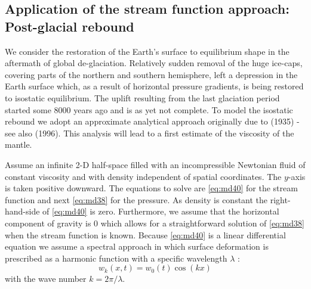 \vspace{0.5cm}
\vspace{0.5cm}

\subsection{Application of the stream function approach: Post-glacial rebound}

We consider the restoration of the Earth’s surface to equilibrium shape in the aftermath of
global de-glaciation. Relatively sudden removal of the huge ice-caps, covering parts of
the northern and southern hemisphere, left a depression in the Earth surface which, as a
result of horizontal pressure gradients, is being restored to isostatic equilibrium. The
uplift resulting from the last glaciation period started some 8000 years ago and is as yet
not complete. To model the isostatic rebound we adopt an approximate analytical
approach originally due to \textcite{hask35} (1935) - see also \textcite{mitr96} (1996). 
This analysis will lead to a first estimate of the viscosity of the mantle.

Assume an infinite 2-D half-space filled with an incompressible Newtonian fluid of
constant viscosity and with density independent of spatial coordinates. The $y$-axis is taken
positive downward. The equations to solve are \eqref{eq:md40} for the stream function and next \eqref{eq:md38}
for the pressure. As density is constant the right-hand-side of \eqref{eq:md40} is zero. Furthermore,
we assume that the horizontal component of gravity is 0 which allows for a
straightforward solution of \eqref{eq:md38} when the stream function is known.
Because \eqref{eq:md40} is a linear differential equation we assume a spectral approach in which
surface deformation is prescribed as a harmonic function with a specific wavelength $\lambda$ :
\begin{equation}
w_k(x,t) = w_0(t) \cos (kx) 
\label{eq:md41}
\end{equation}
with the wave number $k = 2\pi /\lambda$.




